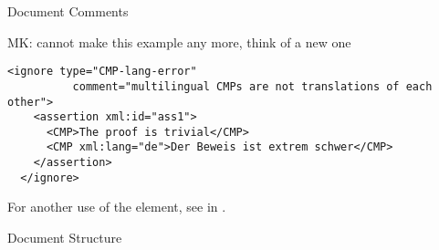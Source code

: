 \begin{omgroup}[id=omdoc-infrastructure,short=Document Infrastructure]
\begin{omgroup}[id=comment]{Document Comments}
\begin{module}[id=comments]
\begin{oldpart}{MK: cannot make this example any more, think of a new one}
\begin{example}
\begin{lstlisting}[label=lst:ignore-error,
  caption={Marking up Mathematical Errors Using \element{ignore}},
  numbers=none,index={ignore}]
  <ignore type="CMP-lang-error" 
          comment="multilingual CMPs are not translations of each other">
    <assertion xml:id="ass1">
      <CMP>The proof is trivial</CMP>
      <CMP xml:lang="de">Der Beweis ist extrem schwer</CMP>
    </assertion>
  </ignore>
\end{lstlisting}    
For another use of the  element, see {} in
.
\end{example}
\end{oldpart}
\end{module}
\end{omgroup}

\begin{omgroup}[id=sectioning]{Document Structure}
\begin{module}[id=sectioning]


\end{module}
\end{omgroup}
\end{omgroup}
